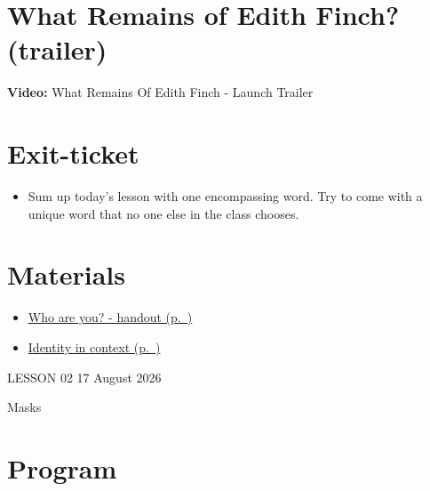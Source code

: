 \documentclass[11pt,a4paper,oneside]{book}
\begin{document}
\section*{What Remains of Edith Finch? (trailer)}

\par\noindent\textbf{Video:} What Remains Of Edith Finch - Launch Trailer\par\medskip

\section*{Exit-ticket}

\begin{itemize}
\item Sum up today's lesson with one encompassing word. Try to come with a unique word that no one else in the class chooses.
\end{itemize}

\section*{Materials}

\begin{itemize}
\item \hyperref[worksheet-1]{Who are you? - handout (p.~\pageref*{worksheet-1})}
\item \hyperref[worksheet-2]{Identity in context (p.~\pageref*{worksheet-2})}
\end{itemize}

\clearpage{}
{\color{blue}\small LESSON 02 \hfill 17 August 2026\par}
\vspace{4mm}
{\displayfont\color{navy}\fontsize{30}{34}\selectfont Masks\par}\vspace{4mm}

\section*{Program}
\end{document}
